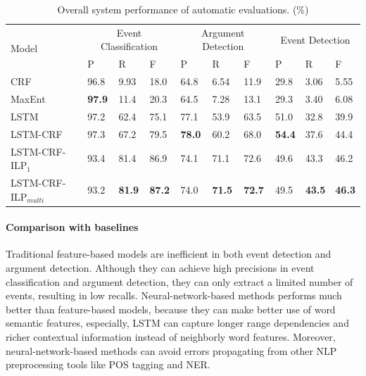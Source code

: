 \documentclass{article}
\begin{document}
\begin{table}[!t]
\centering
\small
\begin{tabular}{|l|p{0.8cm}<{\centering}|p{0.8cm}<{\centering}|p{0.8cm}<{\centering}|p{0.8cm}<{\centering}|p{0.8cm}<{\centering}|p{0.8cm}<{\centering}|p{0.8cm}<{\centering}|p{0.8cm}<{\centering}|p{0.8cm}<{\centering}|} \hline
	\multirow{2}{*}{Model} & \multicolumn{3}{c|}{Event Classification} & \multicolumn{3}{c|}{Argument Detection} & 
	\multicolumn{3}{c|}{Event Detection} \\ \cline{2-10}
	 & P & R & F & P & R & F & P & R & F \\ \hline
	CRF & 96.8 & 9.93 & 18.0 & 64.8 & 6.54 & 11.9 & 29.8 & 3.06 & 5.55 \\ \hline
	MaxEnt & \textbf{97.9} & 11.4 & 20.3 & 64.5 & 7.28 & 13.1 & 29.3 & 3.40 & 6.08 \\ \hline
	LSTM & 97.2 & 62.4 & 75.1 & 77.1 & 53.9 & 63.5 & 51.0 & 32.8 & 39.9  \\ \hline \hline
	LSTM-CRF & 97.3 & 67.2 & 79.5 & \textbf{78.0} & 60.2 & 68.0  & \textbf{54.4} & 37.6 & 44.4  \\ \hline
	LSTM-CRF-ILP$_{1}$ & 93.4 & 81.4 & 86.9 & 74.1 & 71.1 & 72.6  & 49.6 & 43.3 & 46.2 \\ \hline
	LSTM-CRF-ILP$_{multi}$ & 93.2 & \textbf{81.9} & \textbf{87.2} &  74.0 & \textbf{71.5} & \textbf{72.7} & 49.5 & \textbf{43.5} & \textbf{46.3} \\ \hline
\end{tabular}
\caption{Overall system performance of automatic evaluations. (\%) \label{tab:1}}
\end{table}

\paragraph{Comparison with baselines}
Traditional feature-based models are inefficient in both event detection and argument detection. Although they can achieve high precisions in event classification and argument detection, they can only extract a limited number of events, resulting in low recalls. Neural-network-based methods performs much better than feature-based models, because they can make better use of word semantic features, especially, LSTM can capture longer range dependencies and richer contextual information instead of neighborly word features. Moreover, neural-network-based methods can avoid errors propagating from other NLP preprocessing tools like POS tagging and NER.
\end{document}
